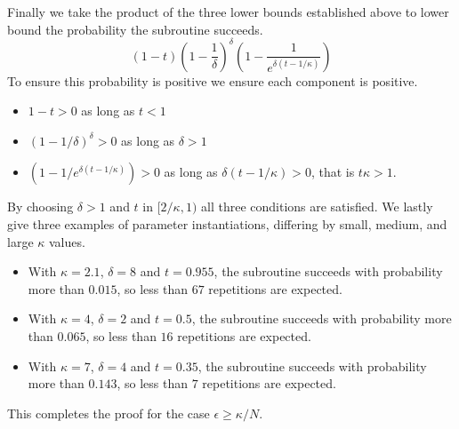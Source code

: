 Finally we take the product of the three lower bounds established above to lower bound the probability the subroutine succeeds.
\begin{equation}
    (1-t)
    \left(1-\frac{1}{\delta}\right)^\delta
    \left(1 - \frac{1}{e^{\delta(t-1/\kappa)}}\right)
\end{equation}
To ensure this probability is positive we ensure each component is positive.
\begin{itemize}
    \item
    $1-t > 0$ as long as $t < 1$
    \item
    $(1-1/\delta)^\delta > 0$ as long as $\delta > 1$
    \item
    $\left(1 - 1/e^{\delta(t-1/\kappa)}\right) > 0$ as long as $\delta(t-1/\kappa) > 0$, that is $t\kappa > 1$.
\end{itemize}
By choosing $\delta > 1$ and $t$ in $[2/\kappa,1)$ all three conditions are satisfied.
We lastly give three examples of parameter instantiations, differing by small, medium, and large $\kappa$ values.
\begin{itemize}
    \item
    With $\kappa = 2.1$, $\delta = 8$ and $t = 0.955$, the subroutine succeeds with probability more than $0.015$, so less than $67$ repetitions are expected.

    \item
    With $\kappa=4$, $\delta=2$ and $t = 0.5$, the subroutine succeeds with probability more than $0.065$, so less than $16$ repetitions are expected.

    \item
    With $\kappa = 7$, $\delta = 4$ and $t = 0.35$, the subroutine succeeds with probability more than $0.143$, so less than $7$ repetitions are expected.
\end{itemize}

This completes the proof for the case $\epsilon \geq \kappa/N$.
